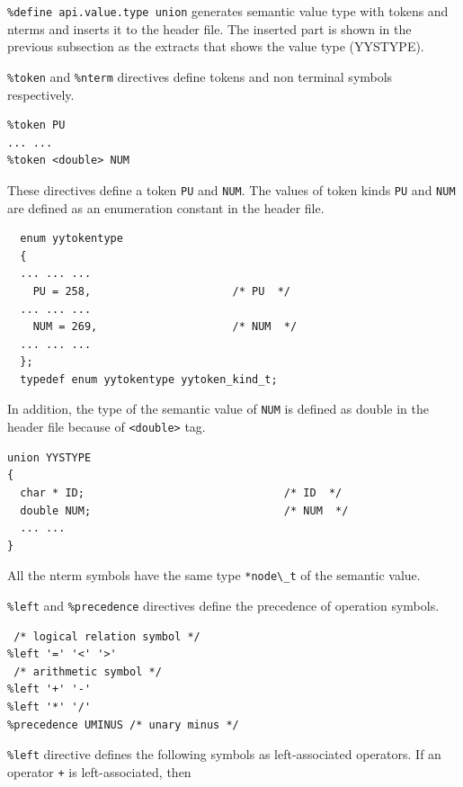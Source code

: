 \passthrough{\lstinline!\%define api.value.type union!} generates
semantic value type with tokens and nterms and inserts it to the header
file. The inserted part is shown in the previous subsection as the
extracts that shows the value type (YYSTYPE).

\passthrough{\lstinline!\%token!} and \passthrough{\lstinline!\%nterm!}
directives define tokens and non terminal symbols respectively.

\begin{lstlisting}
%token PU
... ...
%token <double> NUM
\end{lstlisting}

These directives define a token \passthrough{\lstinline!PU!} and
\passthrough{\lstinline!NUM!}. The values of token kinds
\passthrough{\lstinline!PU!} and \passthrough{\lstinline!NUM!} are
defined as an enumeration constant in the header file.

\begin{lstlisting}
  enum yytokentype
  {
  ... ... ...
    PU = 258,                      /* PU  */
  ... ... ...
    NUM = 269,                     /* NUM  */
  ... ... ...
  };
  typedef enum yytokentype yytoken_kind_t;
\end{lstlisting}

In addition, the type of the semantic value of
\passthrough{\lstinline!NUM!} is defined as double in the header file
because of \passthrough{\lstinline!<double>!} tag.

\begin{lstlisting}
union YYSTYPE
{
  char * ID;                               /* ID  */
  double NUM;                              /* NUM  */
  ... ...
}
\end{lstlisting}

All the nterm symbols have the same type
\passthrough{\lstinline!*node\_t!} of the semantic value.

\passthrough{\lstinline!\%left!} and
\passthrough{\lstinline!\%precedence!} directives define the precedence
of operation symbols.

\begin{lstlisting}
 /* logical relation symbol */
%left '=' '<' '>'
 /* arithmetic symbol */
%left '+' '-'
%left '*' '/'
%precedence UMINUS /* unary minus */
\end{lstlisting}

\passthrough{\lstinline!\%left!} directive defines the following symbols
as left-associated operators. If an operator \passthrough{\lstinline!+!}
is left-associated, then

